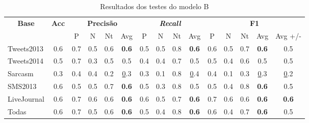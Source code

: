 \documentclass[12pt]{article}
\begin{document}
\begin{table}[H]
\centering
\begin{adjustwidth}{-1cm}{}
\begin{tabular}{lcccccccccccccc}
\multicolumn{1}{c}{\textbf{Base}} & \textbf{Acc} & \multicolumn{4}{c}{\textbf{Precisão}} & \multicolumn{4}{c}{\textit{\textbf{Recall}}} & \multicolumn{5}{c}{\textbf{F1}} \\
 &  & \multicolumn{1}{c|}{P} & \multicolumn{1}{c|}{N} & \multicolumn{1}{c|}{Nt} & Avg & \multicolumn{1}{c|}{P} & \multicolumn{1}{c|}{N} & \multicolumn{1}{c|}{Nt} & Avg & \multicolumn{1}{c|}{P} & \multicolumn{1}{c|}{N} & \multicolumn{1}{c|}{Nt} & \multicolumn{1}{c|}{Avg} & Avg +/- \\
Tweets2013 & 0.6 & 0.7 & 0.5 & 0.6 & \textbf{0.6} & 0.5 & 0.5 & 0.8 & \textbf{0.6} & 0.6 & 0.5 & 0.7 & \textbf{0.6} & 0.5 \\ \hline
Tweets2014 & 0.5 & 0.7 & 0.3 & 0.5 & 0.5 & 0.4 & 0.4 & 0.7 & 0.5 & 0.5 & 0.4 & 0.6 & 0.5 & 0.5 \\ \hline
Sarcasm & 0.3 & 0.4 & 0.4 & 0.2 & {\ul 0.3} & 0.3 & 0.1 & 0.8 & {\ul 0.4} & 0.4 & 0.1 & 0.3 & {\ul 0.3} & {\ul 0.2} \\ \hline
SMS2013 & 0.6 & 0.5 & 0.5 & 0.7 & \textbf{0.6} & 0.5 & 0.3 & 0.8 & 0.5 & 0.5 & 0.4 & 0.8 & \textbf{0.6} & 0.5 \\ \hline
LiveJournal & 0.6 & 0.7 & 0.6 & 0.6 & \textbf{0.6} & 0.6 & 0.5 & 0.7 & \textbf{0.6} & 0.7 & 0.6 & 0.6 & \textbf{0.6} & \textbf{0.6} \\ \hline
Todas & 0.6 & 0.7 & 0.5 & 0.6 & \textbf{0.6} & 0.5 & 0.4 & 0.8 & \textbf{0.6} & 0.6 & 0.4 & 0.7 & \textbf{0.6} & 0.5 \\ \hline
\end{tabular}
\caption{Resultados dos testes do modelo B}
\label{test2}
\end{adjustwidth}
\end{table}
\end{document}

